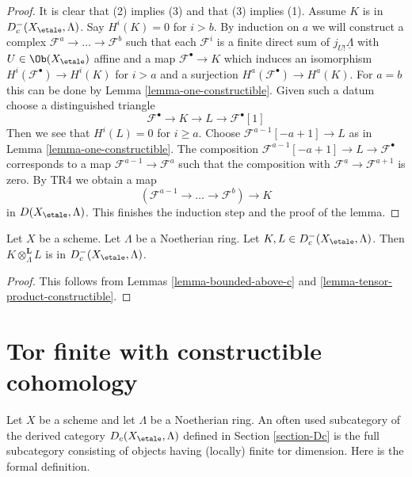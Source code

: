\begin{proof}
It is clear that (2) implies (3) and that (3) implies (1).
Assume $K$ is in $D_c^-(X_\etale, \Lambda)$.
Say $H^i(K) = 0$ for $i > b$. By induction on $a$
we will construct a complex $\mathcal{F}^a \to \ldots \to \mathcal{F}^b$
such that each $\mathcal{F}^i$ is a finite direct sum
of $j_{U!}\underline{\Lambda}$ with $U \in \Ob(X_\etale)$ affine
and a map $\mathcal{F}^\bullet \to K$ which induces an isomorphism
$H^i(\mathcal{F}^\bullet) \to H^i(K)$ for $i > a$ and a surjection
$H^a(\mathcal{F}^\bullet) \to H^a(K)$.
For $a = b$ this can be done by Lemma \ref{lemma-one-constructible}.
Given such a datum choose a distinguished triangle
$$
\mathcal{F}^\bullet \to K \to L \to \mathcal{F}^\bullet[1]
$$
Then we see that $H^i(L) = 0$ for $i \geq a$. Choose
$\mathcal{F}^{a - 1}[-a +1] \to L$ as in
Lemma \ref{lemma-one-constructible}. The composition
$\mathcal{F}^{a - 1}[-a +1] \to L \to \mathcal{F}^\bullet$
corresponds to a map $\mathcal{F}^{a - 1} \to \mathcal{F}^a$
such that the composition with $\mathcal{F}^a \to \mathcal{F}^{a + 1}$
is zero. By TR4 we obtain a map
$$
(\mathcal{F}^{a - 1} \to \ldots \to \mathcal{F}^b) \to K
$$
in $D(X_\etale, \Lambda)$. This finishes the induction step and the
proof of the lemma.
\end{proof}

\begin{lemma}
\label{lemma-tensor-c}
Let $X$ be a scheme. Let $\Lambda$ be a Noetherian ring.
Let $K, L \in D_c^-(X_\etale, \Lambda)$. Then
$K \otimes_\Lambda^\mathbf{L} L$ is in $D_c^-(X_\etale, \Lambda)$.
\end{lemma}

\begin{proof}
This follows from Lemmas \ref{lemma-bounded-above-c} and
\ref{lemma-tensor-product-constructible}.
\end{proof}




\section{Tor finite with constructible cohomology}
\label{section-ctf}

\noindent
Let $X$ be a scheme and let $\Lambda$ be a Noetherian ring. An often used
subcategory of the derived category $D_c(X_\etale, \Lambda)$ defined
in Section \ref{section-Dc} is the full subcategory consisting of objects
having (locally) finite tor dimension. Here is the formal definition.

